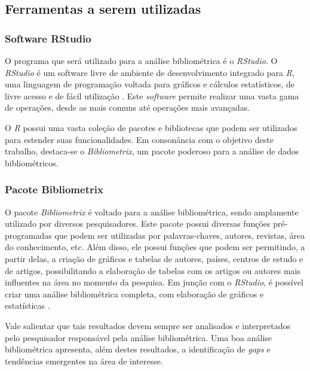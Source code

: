\documentclass{article}[12pt]
\begin{document}
\subsection{Ferramentas a serem utilizadas}

\subsubsection{Software RStudio}
O programa que será utilizado para a análise bibliométrica é o \textit{RStudio}. O \textit{RStudio}
é um software livre de ambiente de desenvolvimento integrado para \textit{R}, uma linguagem de
programação voltada para gráficos e cálculos estatísticos, de livre acesso e de fácil utilização
\cite{Rstudio2021}. Este \textit{software} permite realizar uma vasta gama de operações, desde as
mais comuns até operações mais avançadas. \par

O \textit{R} possui uma vasta coleção de pacotes e bibliotecas que podem ser utilizados para
estender suas funcionalidades. Em consonância com o objetivo deste trabalho, destaca-se o
\textit{Bibliometrix}, um pacote poderoso para a análise de dados bibliométricos. \par

\subsubsection{Pacote Bibliometrix}

O pacote \textit{Bibliometrix} é voltado para a análise bibliométrica, sendo amplamente utilizado
por diversos pesquisadores.
Este pacote possui diversas funções pré-programadas que podem ser utilizadas
por palavras-chaves, autores, revistas, área do conhecimento, etc. Além disso, ele possui funções
que podem ser
permitindo, a partir delas, a criação de gráficos e tabelas de autores, países, centros de estudo e
de artigos, possibilitando a elaboração de tabelas com os artigos ou autores mais influentes na área
no momento da pesquisa. Em junção com o \textit{RStudio}, é possível criar uma análise bibliométrica
completa, com elaboração de gráficos e estatísticas \cite{Bibliometrix2017}. 

Vale salientar que tais resultados devem sempre ser analisados e interpretados pelo pesquisador
responsável pela análise bibliométrica. Uma boa análise bibliométrica apresenta, além destes
resultados, a identificação de \textit{gaps} e tendências emergentes na área de interesse. \par
\end{document}
